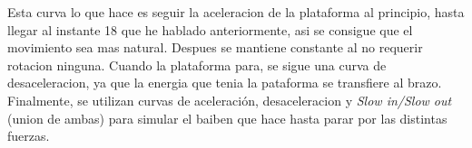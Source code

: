 \documentclass{article}
\begin{document}
Esta curva lo que hace es seguir la aceleracion de la plataforma al principio, hasta llegar al instante 18 que he hablado anteriormente, asi se consigue que el movimiento sea mas natural. Despues se mantiene constante al no requerir rotacion ninguna. Cuando la plataforma para, se sigue una curva de desaceleracion, ya que la energia que tenia la pataforma se transfiere al brazo. Finalmente, se utilizan curvas de aceleración, desaceleracion y \textit{Slow in/Slow out} (union de ambas) para simular el baiben que hace hasta parar por las distintas fuerzas.
\end{document}
